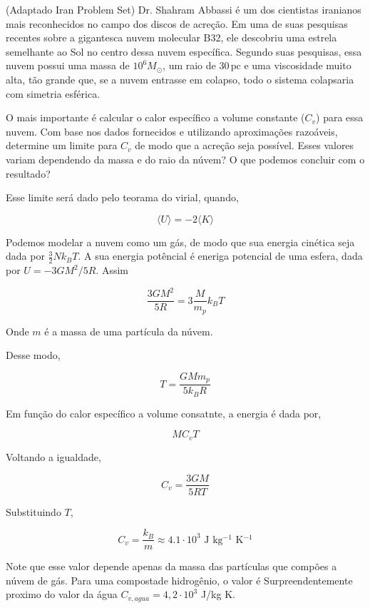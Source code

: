 \documentclass[11pt]{article}
\begin{document}
\begin{pproblem} (Adaptado Iran Problem Set)
    Dr. Shahram Abbassi é um dos cientistas iranianos mais reconhecidos no campo dos discos de acreção. Em uma de suas pesquisas recentes sobre a gigantesca nuvem molecular B32, ele descobriu uma estrela semelhante ao Sol no centro dessa nuvem específica. Segundo suas pesquisas, essa nuvem possui uma massa de $10^6 M_\odot$, um raio de $30 \, \text{pc}$ e uma viscosidade muito alta, tão grande que, se a nuvem entrasse em colapso, todo o sistema colapsaria com simetria esférica.

    O mais importante é calcular o calor específico a volume constante ($C_v$) para essa nuvem. Com base nos dados fornecidos e utilizando aproximações razoáveis, determine um limite para $C_v$ de modo que a acreção seja possível. Esses valores variam dependendo da massa e do raio da núvem? O que podemos concluir com o resultado?
\begin{pssolution*}{}{}
    Esse limite será dado pelo teorama do virial, quando, 

    \[\langle U \rangle = -2 \langle K \rangle\]

    Podemos modelar a nuvem como um gás, de modo que sua energia cinética seja dada por \(\frac{3}{2} N k_B T\). A sua energia potêncial é eneriga potencial de uma esfera, dada por \(U = -3GM^2/5R\). Assim

    \[\frac{3GM^2}{5R} = 3\frac{M}{m_p}k_B T\]

    Onde \(m\) é a massa de uma partícula da núvem.

    Desse modo, 

    \[T = \frac{GMm_p}{5k_B R}\]

    Em função do calor específico a volume consatnte, a energia é dada por, 

    \[M C_v T\]

    Voltando a igualdade, 

    \[C_v = \frac{3GM}{5R T}\]

    Substituindo \(T\), 

    \[\boxed{C_v = \frac{k_B }{m} \approx 4.1 \cdot 10^3 \text{ J kg\(^{-1}\) K\(^{-1}\)}}\]

    Note que esse valor depende apenas da massa das partículas que compões a núvem de gás. Para uma compostade hidrogênio, o valor é Surpreendentemente proximo do valor da água \(C_{v, agua} = 4,2\cdot 10^{3}\) J/kg K. 
\end{pssolution*}
\end{pproblem}
\end{document}
